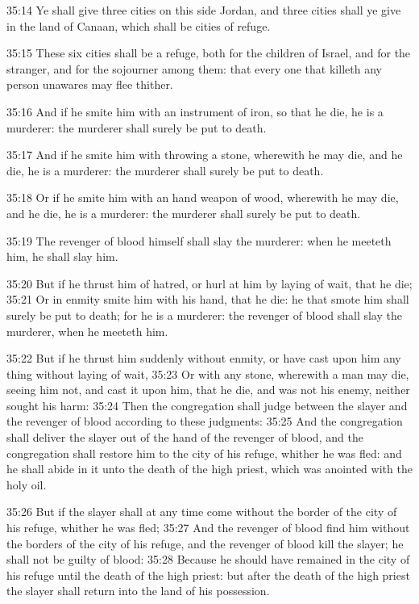 35:14 Ye shall give three cities on this side Jordan, and three cities shall ye give in the land of Canaan, which shall be cities of refuge.

35:15 These six cities shall be a refuge, both for the children of Israel, and for the stranger, and for the sojourner among them: that every one that killeth any person unawares may flee thither.

35:16 And if he smite him with an instrument of iron, so that he die, he is a murderer: the murderer shall surely be put to death.

35:17 And if he smite him with throwing a stone, wherewith he may die, and he die, he is a murderer: the murderer shall surely be put to death.

35:18 Or if he smite him with an hand weapon of wood, wherewith he may die, and he die, he is a murderer: the murderer shall surely be put to death.

35:19 The revenger of blood himself shall slay the murderer: when he meeteth him, he shall slay him.

35:20 But if he thrust him of hatred, or hurl at him by laying of wait, that he die; 35:21 Or in enmity smite him with his hand, that he die: he that smote him shall surely be put to death; for he is a murderer: the revenger of blood shall slay the murderer, when he meeteth him.

35:22 But if he thrust him suddenly without enmity, or have cast upon him any thing without laying of wait, 35:23 Or with any stone, wherewith a man may die, seeing him not, and cast it upon him, that he die, and was not his enemy, neither sought his harm: 35:24 Then the congregation shall judge between the slayer and the revenger of blood according to these judgments: 35:25 And the congregation shall deliver the slayer out of the hand of the revenger of blood, and the congregation shall restore him to the city of his refuge, whither he was fled: and he shall abide in it unto the death of the high priest, which was anointed with the holy oil.

35:26 But if the slayer shall at any time come without the border of the city of his refuge, whither he was fled; 35:27 And the revenger of blood find him without the borders of the city of his refuge, and the revenger of blood kill the slayer; he shall not be guilty of blood: 35:28 Because he should have remained in the city of his refuge until the death of the high priest: but after the death of the high priest the slayer shall return into the land of his possession.

